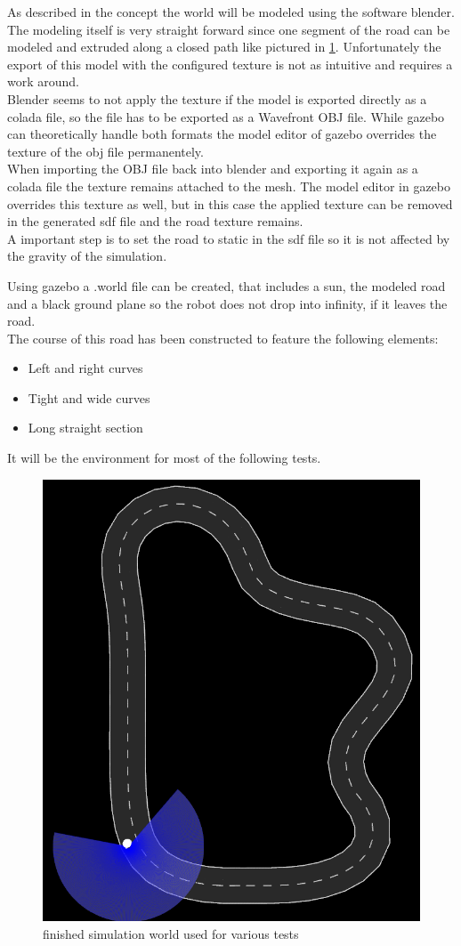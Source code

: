 As described in the concept the world will be modeled using the software blender.\\

The modeling itself is very straight forward since one segment of the road can be modeled and extruded along a closed path like pictured in \ref{simworld}. Unfortunately the export of this model with the configured texture is not as intuitive and requires a work around.\\

Blender seems to not apply the texture if the model is exported directly as a colada file, so the file has to be exported as a Wavefront OBJ file. While gazebo can theoretically handle both formats the model editor of gazebo overrides the texture of the obj file permanentely.\\

When importing the OBJ file back into blender and exporting it again as a colada file the texture remains attached to the mesh. The model editor in gazebo overrides this texture as well, but in this case the applied texture can be removed in the generated sdf file and the road texture remains.\\

A important step is to set the road to static in the sdf file so it is not affected by the gravity of the simulation.

Using gazebo a .world file can be created, that includes a sun, the modeled road and a black ground plane so the robot does not drop into infinity, if it leaves the road.\\

The course of this road has been constructed to feature the following elements:

\begin{itemize}
	\item Left and right curves
	\item Tight and wide curves
	\item Long straight section
\end{itemize}

It will be the environment for most of the following tests.

\begin{figure}
	\centering
	\includegraphics[width=.5\textwidth]{Pictures/test track}
	\caption{finished simulation world used for various tests}
	\label{simworld}
\end{figure}


